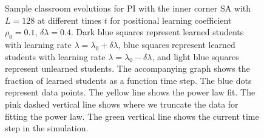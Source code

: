\begin{figure}[htbp!]
   \caption{Sample classroom evolutions for PI with the inner corner SA with $L=128$ at different times $t$ for positional learning coefficient $\rho_0=0.1$, $\delta\lambda = 0.4$.
   Dark blue squares represent learned students with learning rate $\lambda = \lambda_0 + \delta\lambda$, blue squares represent learned students with learning rate $\lambda = \lambda_0 - \delta\lambda$, and light blue squares represent unlearned students.
   The accompanying graph shows the fraction of learned students as a function time step.
   The blue dots represent data points. 
   The yellow line shows the power law fit.
   The pink dashed vertical line shows where we truncate the data for fitting the power law.
   The green vertical line shows the current time step in the simulation.
   }
   \label{fig:2DBPCAIH sample class evolution low rho}
\end{figure}

